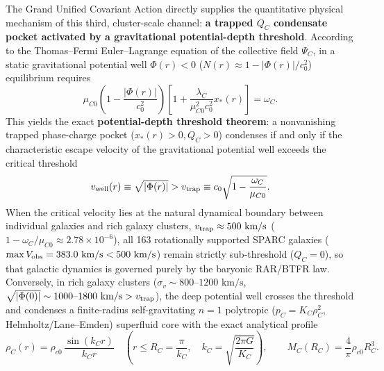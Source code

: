 \documentclass[11pt,a4paper]{article}
\begin{document}
The Grand Unified Covariant Action directly supplies the quantitative physical mechanism of this third, cluster-scale channel: \textbf{a trapped $Q_C$ condensate pocket activated by a gravitational potential-depth threshold}. According to the Thomas--Fermi Euler--Lagrange equation of the collective field $\Psi_C$, in a static gravitational potential well $\Phi(r) < 0$ ($N(r) \approx 1 - |\Phi(r)|/c_0^2$) equilibrium requires
\begin{equation}
\mu_{C0}\!\left(1 - \frac{|\Phi(r)|}{c_0^2}\right)\!\left[1 + \frac{\lambda_C}{\mu_{C0}^2 c_0^2}x_*(r)\right] = \omega_C.
\end{equation}
This yields the exact \textbf{potential-depth threshold theorem}: a nonvanishing trapped phase-charge pocket ($x_*(r) > 0, Q_C > 0$) condenses if and only if the characteristic escape velocity of the gravitational potential well exceeds the critical threshold
\begin{equation}
v_{\rm well}(r) \equiv \sqrt{|\Phi(r)|} > v_{\rm trap} \equiv c_0\sqrt{1 - \frac{\omega_C}{\mu_{C0}}}.
\end{equation}
When the critical velocity lies at the natural dynamical boundary between individual galaxies and rich galaxy clusters, $v_{\rm trap} \approx 500\text{ km/s}$ ($1 - \omega_C/\mu_{C0} \approx 2.78\times 10^{-6}$), all 163 rotationally supported SPARC galaxies ($\max V_{\rm obs} = 383.0\text{ km/s} < 500\text{ km/s}$) remain strictly sub-threshold ($Q_C = 0$), so that galactic dynamics is governed purely by the baryonic RAR/BTFR law. Conversely, in rich galaxy clusters ($\sigma_v \sim 800\text{--}1200\text{ km/s}$, $\sqrt{|\Phi(0)|} \sim 1000\text{--}1800\text{ km/s} > v_{\rm trap}$), the deep potential well crosses the threshold and condenses a finite-radius self-gravitating $n=1$ polytropic ($p_C = K_C\rho_C^2$, Helmholtz/Lane--Emden) superfluid core with the exact analytical profile
\begin{equation}
\rho_C(r) = \rho_{c0}\,\frac{\sin(k_C r)}{k_C r} \quad \left(r \le R_C = \frac{\pi}{k_C},\quad k_C = \sqrt{\frac{2\pi G}{K_C}}\right), \qquad M_C(R_C) = \frac{4}{\pi}\rho_{c0} R_C^3.
\end{equation}
\end{document}
